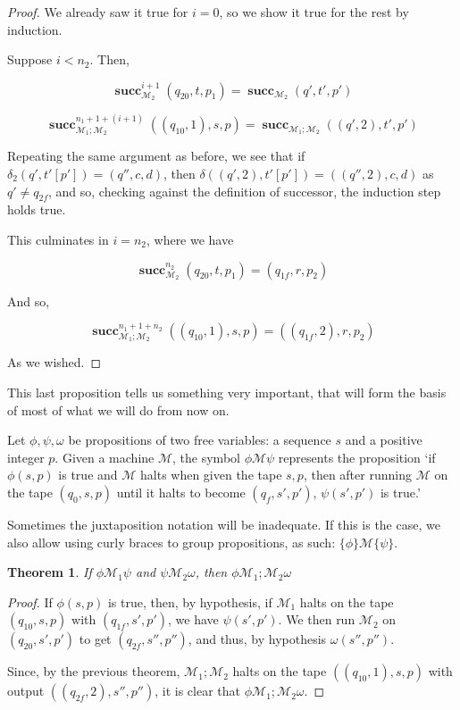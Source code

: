 \documentclass{article}
\newtheorem{theorem}{Theorem}
\newcommand{\M}{\mathcal{M}}
\DeclareMathOperator{\suc}{\mathbf{succ}}
\begin{document}
\begin{proof}
	We already saw it true for $i=0$, so we show it true for the rest by induction.
	
	Suppose $i < n_2$. Then,
	
	\[\suc^{i+1}_{\M_2} (q_{20}, t, p_1) = \suc_{\M_2} (q', t', p')\]
	
	\[\suc^{n_1+1+(i+1)}_{\M_1;\M_2} ((q_{10}, 1), s, p) = \suc_{\M_1;\M_2} ((q', 2), t', p')\]
	
	Repeating the same argument as before, we see that if $\delta_2(q', t'[p']) = (q'', c, d)$, then $\delta((q',2), t'[p']) = ((q'', 2), c, d)$ as $q' \neq q_{2f}$, and so, checking against the definition of successor, the induction step holds true.
	
	This culminates in $i = n_2$, where we have
	
	\[\suc^{n_2}_{\M_2} (q_{20}, t, p_1) = (q_{1f}, r, p_2)\]
	
	And so,
	
	\[\suc^{n_1 + 1 + n_2}_{\M_1;\M_2} ((q_{10},1), s, p) = ((q_{1f},2), r, p_2)\]
	
	As we wished.
	\end{proof}
	
	This last proposition tells us something very important, that will form the basis of most of what we will do from now on.
	
	Let $\phi, \psi, \omega$ be propositions of two free variables: a sequence $s$ and a positive integer $p$. Given a machine $\M$, the symbol $\phi\M\psi$ represents the proposition `if $\phi(s,p)$ is true and $\M$ halts when given the tape $s, p$, then after running $\M$ on the tape $(q_0, s, p)$ until it halts to become $(q_f, s', p')$, $\psi(s', p')$ is true.'
	
	Sometimes the juxtaposition notation will be inadequate. If this is the case, we also allow using curly braces to group propositions, as such: $\{\phi\}\M\{\psi\}$.
	
	
	\begin{theorem}
	If $\phi \M_1 \psi$ and $\psi \M_2 \omega$, then $\phi \M_1;\M_2 \omega$
	\end{theorem}
	
	\begin{proof}
	
	If $\phi(s,p)$ is true, then, by hypothesis, if $\M_1$ halts on the tape $(q_{10}, s, p)$ with $(q_{1f}, s', p')$, we have $\psi(s', p')$. We then run $\M_2$ on $(q_{20}, s', p')$ to get $(q_{2f}, s'', p'')$, and thus, by hypothesis $\omega(s'', p'')$.
	
	Since, by the previous theorem, $\M_1;\M_2$ halts on the tape $((q_{10}, 1),s,p)$ with output $((q_{2f}, 2), s'', p'')$, it is clear that $\phi \M_1;\M_2 \omega$.
	
	\end{proof}
	
\end{document}
